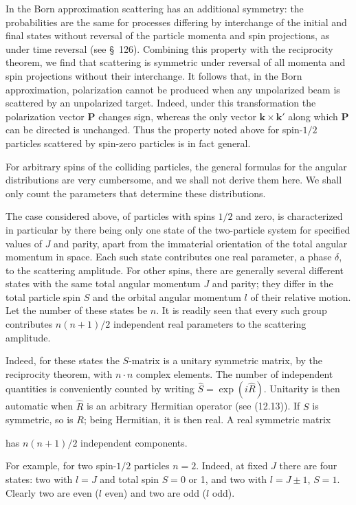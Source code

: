 In the Born approximation scattering has an additional symmetry: the
probabilities are the same for processes differing by interchange of the
initial and final states without reversal of the particle momenta and spin
projections, as under time reversal (see \S~126). Combining this property with
the reciprocity theorem, we find that scattering is symmetric under reversal
of all momenta and spin projections without their interchange. It follows
that, in the Born approximation, polarization cannot be produced when any
unpolarized beam is scattered by an unpolarized target. Indeed, under this
transformation the polarization vector $\mathbf P$ changes sign, whereas the
only vector $\mathbf k\times\mathbf k'$ along which $\mathbf P$ can be
directed is unchanged. Thus the property noted above for spin-$1/2$ particles
scattered by spin-zero particles is in fact general.

For arbitrary spins of the colliding particles, the general formulas for the
angular distributions are very cumbersome, and we shall not derive them
here. We shall only count the parameters that determine these distributions.

The case considered above, of particles with spins $1/2$ and zero, is
characterized in particular by there being only one state of the two-particle
system for specified values of $J$ and parity, apart from the immaterial
orientation of the total angular momentum in space. Each such state
contributes one real parameter, a phase $\delta$, to the scattering amplitude.
For other spins, there are generally several different states with the same
total angular momentum $J$ and parity; they differ in the total particle spin
$S$ and the orbital angular momentum $l$ of their relative motion. Let the
number of these states be $n$. It is readily seen that every such group
contributes $n(n+1)/2$ independent real parameters to the scattering
amplitude.

Indeed, for these states the $S$-matrix is a unitary symmetric matrix, by the
reciprocity theorem, with $n\cdot n$ complex elements. The number of
independent quantities is conveniently counted by writing
$\hat S=\exp(i\hat R)$. Unitarity is then automatic when $\hat R$ is an
arbitrary Hermitian operator (see (12.13)). If $S$ is symmetric, so is $R$;
being Hermitian, it is then real. A real symmetric matrix

has $n(n+1)/2$ independent components.

For example, for two spin-$1/2$ particles $n=2$. Indeed, at fixed $J$ there
are four states: two with $l=J$ and total spin $S=0$ or 1, and two with
$l=J\pm1$, $S=1$. Clearly two are even ($l$ even) and two are odd ($l$ odd).

